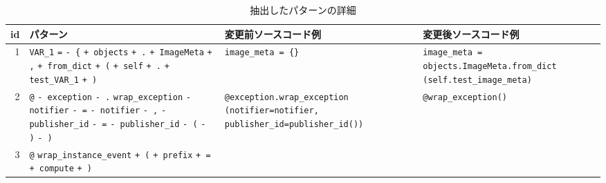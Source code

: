 \documentclass[11pt]{jreport}
\begin{document}
\begin{table}[t]
    \centering
    \caption{抽出したパターンの詳細}
    \label{table:description}
    \begin{tabular}{r|p{6cm}|p{5cm}|p{5cm}}
        \hline \hline
        id & パターン & 変更前ソースコード例 & 変更後ソースコード例 \\ \hline
        1 & 
        \colorbox{lightgray!50}{\texttt{VAR\_1}} \colorbox{lightgray!50}{\texttt{=}} \colorbox{lightgray!50}{\texttt{- \{}} \colorbox{lightgray!50}{\texttt{+ objects}} \colorbox{lightgray!50}{\texttt{+ .}} \newline
        \colorbox{lightgray!50}{\texttt{+ ImageMeta}} \colorbox{lightgray!50}{\texttt{+ ,}} \colorbox{lightgray!50}{\texttt{+ from\_dict}} \colorbox{lightgray!50}{\texttt{+ (}} \newline
        \colorbox{lightgray!50}{\texttt{+ self}} \colorbox{lightgray!50}{\texttt{+ .}} \colorbox{lightgray!50}{\texttt{+ test\_VAR\_1}} \colorbox{lightgray!50}{\texttt{+ )}}
        & 
        \texttt{image\_meta = \{\}} 
        & 
        \texttt{image\_meta = \newline
        objects.ImageMeta.from\_dict \newline
        (self.test\_image\_meta)} \\
        \hline
        2 &
        \colorbox{lightgray!50}{\texttt{@}} \colorbox{lightgray!50}{\texttt{- exception}} \colorbox{lightgray!50}{\texttt{- .}} \colorbox{lightgray!50}{\texttt{wrap\_exception}}
        \newline
        \colorbox{lightgray!50}{\texttt{- notifier}} \colorbox{lightgray!50}{\texttt{- =}} \colorbox{lightgray!50}{\texttt{- notifier}} \colorbox{lightgray!50}{\texttt{- ,}}
        \newline
        \colorbox{lightgray!50}{\texttt{- publisher\_id}} \colorbox{lightgray!50}{\texttt{- =}} 
        \colorbox{lightgray!50}{\texttt{- publisher\_id}} \colorbox{lightgray!50}{\texttt{- (}} \colorbox{lightgray!50}{\texttt{- )}} \colorbox{lightgray!50}{\texttt{- )}}
        &
        \texttt{@exception.wrap\_exception
        \newline
        (notifier=notifier, publisher\_id=publisher\_id())}
        &
        \texttt{@wrap\_exception()}\\
        \hline
        3 &
        \colorbox{lightgray!50}{\texttt{@}} \colorbox{lightgray!50}{\texttt{wrap\_instance\_event}} \colorbox{lightgray!50}{\texttt{+ (}} 
        \newline
        \colorbox{lightgray!50}{\texttt{+ prefix}} \colorbox{lightgray!50}{\texttt{+ =}} \colorbox{lightgray!50}{\texttt{+ compute}} \colorbox{lightgray!50}{\texttt{+ )}}

\end{tabular}
\end{table}
\end{document}
